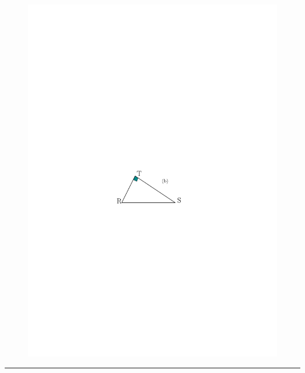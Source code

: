 \documentclass[12pt]{article}
\newcommand{\horrule}[1]{\rule{\linewidth}{#1}} %
\begin{document}
\begin{multicols}{3}
  \begin{figure}[H]
    \centering
    \includegraphics[width=0.7\linewidth]{sources/1/exo1-tri-2a.pdf}
  \end{figure}
  
\end{multicols}

\horrule{1px}
\end{document}
